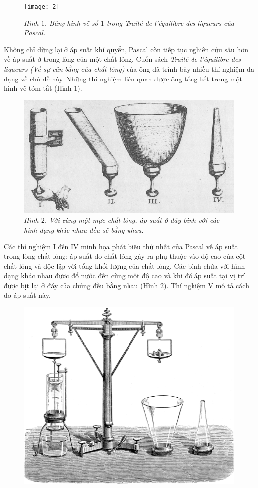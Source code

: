 \begin{multicols}{2}
\begin{figure}[H]
		\texttt{[image: 2]}
		\caption{\small\textit{\color{timhieukhoahoc}Hình $1$. Bảng hình vẽ số $1$ trong Traité de l'équilibre des liqueurs của Pascal.}}
		\vspace*{-5pt}
	\end{figure}
	Không chỉ dừng lại ở áp suất khí quyển, Pascal còn tiếp tục nghiên cứu sâu hơn về áp suất ở trong lòng của một chất lỏng. Cuốn sách \textit{Traité de l'équilibre des liqueurs (Về sự cân bằng của chất lỏng)} của ông đã trình bày nhiều thí nghiệm đa dạng về chủ đề này. Những thí nghiệm liên quan được ông tổng kết trong một hình vẽ tóm tắt (Hình $1$).
	\begin{figure}[H]
		\vspace*{-5pt}
		\centering
		\captionsetup{labelformat= empty, justification=centering}
		\includegraphics[width= 0.95\linewidth]{3}
		\caption{\small\textit{\color{timhieukhoahoc}Hình $2$. Với cùng một mực chất lỏng, áp suất ở đáy bình với các hình dạng khác nhau đều sẽ bằng nhau.}}
		\vspace*{-10pt}
	\end{figure}
	Các thí nghiệm I đến IV minh họa phát biểu thứ nhất của Pascal về áp suất trong lòng chất lỏng: áp suất do chất lỏng gây ra phụ thuộc vào độ cao của cột chất lỏng và độc lập với tổng khối lượng của chất lỏng. Các bình chứa với hình dạng khác nhau được đổ nước đến cùng một độ cao và khi đó áp suất tại vị trí được bịt lại ở đáy của chúng đều bằng nhau (Hình $2$). Thí nghiệm V mô tả cách đo áp suất này.
	\begin{figure}[H]
		\vspace*{-10pt}
		\centering
		\captionsetup{labelformat= empty, justification=centering}
		\includegraphics[width= 0.85\linewidth]{4}

\end{figure}
\end{multicols}
